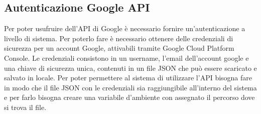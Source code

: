 \subsection{Autenticazione Google API}\label{cap:google}
Per poter usufruire dell'API di Google \`e necessario fornire un'autenticazione a livello
di sistema.
Per poterlo fare \`e necessario ottenere delle credenziali di sicurezza per un account Google,
attivabili tramite Google Cloud Platform Console.
Le credenziali consistono in un username, l'email dell'account google e una chiave di sicurezza unica,
 contenuti in un file JSON che pu\`o essere scaricato e salvato in locale.
Per poter permettere al sistema di utilizzare l'API bisogna fare in modo che il file JSON con le credenziali sia
raggiungibile all'interno del sistema e per farlo bisogna creare una variabile d'ambiente con assegnato il percorso
dove si trova il file.

